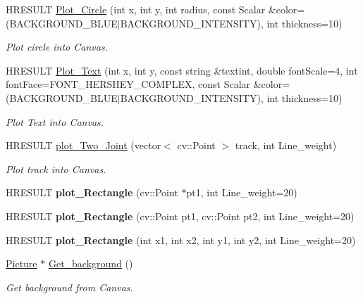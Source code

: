 \begin{DoxyCompactItemize}
H\+R\+E\+S\+U\+LT \hyperlink{class_my_picture_1_1view_a35a3dab7201ed1c83794af6d203a5f8f}{Plot\+\_\+\+Circle} (int x, int y, int radius, const Scalar \&color=(B\+A\+C\+K\+G\+R\+O\+U\+N\+D\+\_\+\+B\+L\+UE$\vert$B\+A\+C\+K\+G\+R\+O\+U\+N\+D\+\_\+\+I\+N\+T\+E\+N\+S\+I\+TY), int thickness=10)
\begin{DoxyCompactList}\small\item\em Plot circle into Canvas. \end{DoxyCompactList}\item 
H\+R\+E\+S\+U\+LT \hyperlink{class_my_picture_1_1view_a91f7b33a68055cd087d1ed87e0ab09b8}{Plot\+\_\+\+Text} (int x, int y, const string \&textint, double font\+Scale=4, int font\+Face=F\+O\+N\+T\+\_\+\+H\+E\+R\+S\+H\+E\+Y\+\_\+\+C\+O\+M\+P\+L\+EX, const Scalar \&color=(B\+A\+C\+K\+G\+R\+O\+U\+N\+D\+\_\+\+B\+L\+UE$\vert$B\+A\+C\+K\+G\+R\+O\+U\+N\+D\+\_\+\+I\+N\+T\+E\+N\+S\+I\+TY), int thickness=10)
\begin{DoxyCompactList}\small\item\em Plot Text into Canvas. \end{DoxyCompactList}\item 
H\+R\+E\+S\+U\+LT \hyperlink{class_my_picture_1_1view_afb8d800dbc874b4850193e6589320117}{plot\+\_\+\+Two\+\_\+\+Joint} (vector$<$ cv\+::\+Point $>$ track, int Line\+\_\+weight)
\begin{DoxyCompactList}\small\item\em Plot track into Canvas. \end{DoxyCompactList}\item 
\mbox{\label{class_my_picture_1_1view_a3054488f7702b7f9687d841ac9e88fcd}} 
H\+R\+E\+S\+U\+LT {\bfseries plot\+\_\+\+Rectangle} (cv\+::\+Point $\ast$pt1, int Line\+\_\+weight=20)
\item 
\mbox{\label{class_my_picture_1_1view_a99eb721afd54693ed9c1378cf3ac9521}} 
H\+R\+E\+S\+U\+LT {\bfseries plot\+\_\+\+Rectangle} (cv\+::\+Point pt1, cv\+::\+Point pt2, int Line\+\_\+weight=20)
\item 
\mbox{\label{class_my_picture_1_1view_abcc54355c4e00612cc71453b8aa3bd3b}} 
H\+R\+E\+S\+U\+LT {\bfseries plot\+\_\+\+Rectangle} (int x1, int x2, int y1, int y2, int Line\+\_\+weight=20)
\item 
\hyperlink{class_my_picture_1_1_picture}{Picture} $\ast$ \hyperlink{class_my_picture_1_1view_a64a48e69a874d48cde28c7f28334f8d7}{Get\+\_\+background} ()
\begin{DoxyCompactList}\small\item\em Get background from Canvas. \end{DoxyCompactList}\end{DoxyCompactItemize}
